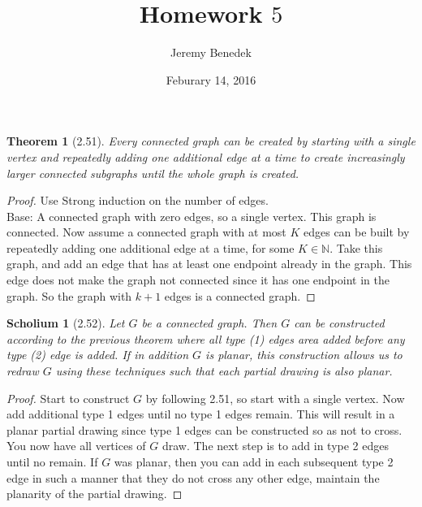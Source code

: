 \documentclass{article}
\title{Homework $5$}
\author{Jeremy Benedek}
\date{Feburary 14, 2016}
\newtheorem*{thm}{Theorem}
\newtheorem*{sch}{Scholium}
\begin{document}
\maketitle

\begin{thm}[2.51]
	Every connected graph can be created by starting with a single vertex and repeatedly adding one additional edge at a time to create increasingly larger connected subgraphs until the whole graph is created.
\end{thm}
\begin{proof}
	Use Strong induction on the number of edges. \\ Base: A connected graph with zero edges, so a single vertex. This graph is connected. Now assume a connected graph with at most $K$ edges can be built by repeatedly
	adding one additional edge at a time, for some $K \in \mathbb{N}$. Take this graph, and add an edge that has at least one endpoint already in the graph. This edge does not make the graph not connected since it has one
	endpoint in the graph. So the graph with $k+1$ edges is a connected graph.
\end{proof}

\begin{sch}[2.52]
	Let $G$ be a connected graph. Then $G$ can be constructed according to the previous theorem where all type (1) edges area added before any type (2) edge is added. If in addition $G$ is planar, this construction allows
	us to redraw $G$ using these techniques such that each partial drawing is also planar.
\end{sch}
\begin{proof}
	Start to construct $G$ by following 2.51, so start with a single vertex. Now add additional type 1 edges until no type 1 edges remain. This will result in a planar partial drawing since type 1 edges can be constructed
	so as not to cross. You now have all vertices of $G$ draw. The next step is to add in type 2 edges until no remain. If $G$ was planar, then you can add in each subsequent type 2 edge in such a manner that they do 
	not cross any other edge, maintain the planarity of the partial drawing.
\end{proof}
\end{document}
